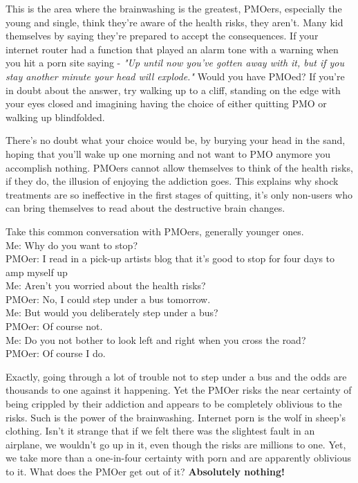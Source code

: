 \documentclass[easypeasy.tex]{subfiles}
\begin{document}
This is the area where the brainwashing is the greatest, PMOers, especially the young and single, think they're aware of the health risks, they aren't. Many kid themselves by saying they're prepared to accept the consequences. If your internet router had a function that played an alarm tone with a warning when you hit a porn site saying - \textit{"Up until now you've gotten away with it, but if you stay another minute your head will explode."} Would you have PMOed? If you're in doubt about the answer, try walking up to a cliff, standing on the edge with your eyes closed and imagining having the choice of either quitting PMO or walking up blindfolded.

There's no doubt what your choice would be, by burying your head in the sand, hoping that you'll wake up one morning and not want to PMO anymore you accomplish nothing. PMOers cannot allow themselves to think of the health risks, if they do, the illusion of enjoying the addiction goes. This explains why shock treatments are so ineffective in the first stages of quitting, it's only non-users who can bring themselves to read about the destructive brain changes.

Take this common conversation with PMOers, generally younger ones.\\
  Me: Why do you want to stop?\\
  PMOer: I read in a pick-up artists blog that it's good to stop for four days to amp myself up\\
  Me: Aren't you worried about the health risks?\\
  PMOer: No, I could step under a bus tomorrow.\\
  Me: But would you deliberately step under a bus?\\
  PMOer: Of course not.\\
  Me: Do you not bother to look left and right when you cross the road?\\
  PMOer: Of course I do.

Exactly, going through a lot of trouble not to step under a bus and the odds are thousands to one against it happening. Yet the PMOer risks the near certainty of being crippled by their addiction and appears to be completely oblivious to the risks. Such is the power of the brainwashing. Internet porn is the wolf in sheep's clothing. Isn't it strange that if we felt there was the slightest fault in an airplane, we wouldn't go up in it, even though the risks are millions to one. Yet, we take more than a one-in-four certainty with porn and are apparently oblivious to it. What does the PMOer get out of it? \textbf{Absolutely nothing!}
\end{document}
